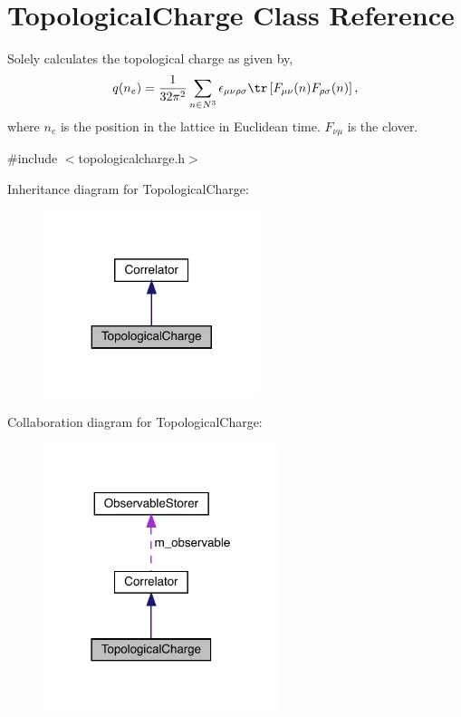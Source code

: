 \hypertarget{class_topological_charge}{}\section{Topological\+Charge Class Reference}
\label{class_topological_charge}


Solely calculates the topological charge as given by, \[ q(n_e) = \frac{1}{32\pi^2} \sum_{n\in N^3} \epsilon_{\mu\nu\rho\sigma} \tr\left[F_{\mu\nu}(n)F_{\rho\sigma}(n)\right], \] where $n_e$ is the position in the lattice in Euclidean time. $F_{\nu\mu}$ is the clover.  




{\ttfamily \#include $<$topologicalcharge.\+h$>$}



Inheritance diagram for Topological\+Charge\+:
\nopagebreak
\begin{figure}[H]
\begin{center}
\leavevmode
\includegraphics[width=179pt]{class_topological_charge__inherit__graph}
\end{center}
\end{figure}


Collaboration diagram for Topological\+Charge\+:
\nopagebreak
\begin{figure}[H]
\begin{center}
\leavevmode
\includegraphics[width=195pt]{class_topological_charge__coll__graph}
\end{center}
\end{figure}
